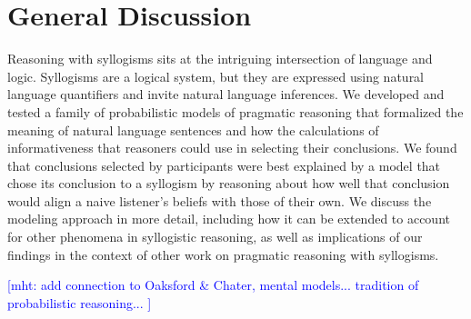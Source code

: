 \documentclass[floatsintext, doc]{apa6}
\newcommand{\mht}[1]{{\textcolor{Blue}{[mht: #1]}}}
\begin{document}









\section{General Discussion}

Reasoning with syllogisms sits at the intriguing intersection of language and logic. 
Syllogisms are a logical system, but they are expressed using natural language quantifiers and invite natural language inferences. 
We developed and tested a family of probabilistic models of pragmatic reasoning that formalized the meaning of natural language sentences and how the calculations of informativeness that reasoners could use in selecting their conclusions.
We found that conclusions selected by participants were best explained by a model that chose its conclusion to a syllogism by reasoning about how well that conclusion would align a naive listener's beliefs with those of their own. 
We discuss the modeling approach in more detail, including how it can be extended to account for other phenomena in syllogistic reasoning, as well as implications of our findings in the context of other work on pragmatic reasoning with syllogisms.

\mht{add connection to Oaksford \& Chater, mental models... tradition of probabilistic reasoning... }
\end{document}
